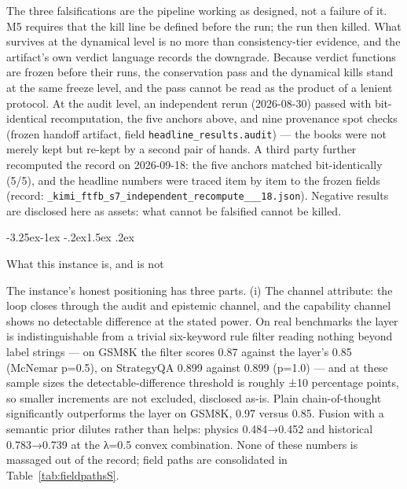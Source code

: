\documentclass[11pt,a4paper]{article}
\makeatletter
\renewcommand\subsection{\@startsection{subsection}{2}{\z@}%
  {-3.25ex\@plus -1ex \@minus -.2ex}{1.5ex \@plus .2ex}%
  {\normalfont\large\bfseries\raggedright}}
\makeatother
\begin{document}
The three falsifications are the pipeline working as designed, not a failure of it. M5 requires that the kill line be defined before the run; the run then killed. What survives at the dynamical level is no more than consistency-tier evidence, and the artifact's own verdict language records the downgrade. Because verdict functions are frozen before their runs, the conservation pass and the dynamical kills stand at the same freeze level, and the pass cannot be read as the product of a lenient protocol. At the audit level, an independent rerun (2026-08-30) passed with bit-identical recomputation, the five anchors above, and nine provenance spot checks (frozen handoff artifact, field \texttt{headline\_\allowbreak results.audit}) — the books were not merely kept but re-kept by a second pair of hands. A third party further recomputed the record on 2026-09-18: the five anchors matched bit-identically (5/5), and the headline numbers were traced item by item to the frozen fields (record: \texttt{\_kimi\_\allowbreak ftfb\_\allowbreak s7\_\allowbreak independent\_\allowbreak recompute\_\_\_\allowbreak 18.json}). Negative results are disclosed here as assets: what cannot be falsified cannot be killed.

\subsection{What this instance is, and is not}

The instance's honest positioning has three parts. (i) The channel attribute: the loop closes through the audit and epistemic channel, and the capability channel shows no detectable difference at the stated power. On real benchmarks the layer is indistinguishable from a trivial six-keyword rule filter reading nothing beyond label strings — on GSM8K the filter scores 0.87 against the layer's 0.85 (McNemar p=0.5), on StrategyQA 0.899 against 0.899 (p=1.0) — and at these sample sizes the detectable-difference threshold is roughly ±10 percentage points, so smaller increments are not excluded, disclosed as-is. Plain chain-of-thought significantly outperforms the layer on GSM8K, 0.97 versus 0.85. Fusion with a semantic prior dilutes rather than helps: physics 0.484→0.452 and historical 0.783→0.739 at the λ=0.5 convex combination. None of these numbers is massaged out of the record; field paths are consolidated in Table~\ref{tab:fieldpathsS}.
\end{document}
